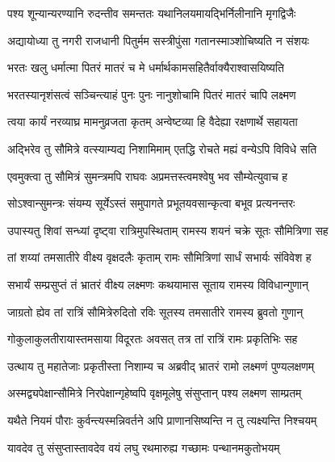 \twolineshloka
{पश्य शून्यान्यरण्यानि रुदन्तीव समन्ततः}
{यथानिलयमायद्भिर्निलीनानि मृगद्विजैः} %

\twolineshloka
{अद्यायोध्या तु नगरी राजधानी पितुर्मम}
{सस्त्रीपुंसा गतानस्माञ्शोचिष्यति न संशयः} %

\twolineshloka
{भरतः खलु धर्मात्मा पितरं मातरं च मे}
{धर्मार्थकामसहितैर्वाक्यैराश्वासयिष्यति} %

\twolineshloka
{भरतस्यानृशंसत्वं सञ्चिन्त्याहं पुनः पुनः}
{नानुशोचामि पितरं मातरं चापि लक्ष्मण} %

\twolineshloka
{त्वया कार्यं नरव्याघ्र मामनुव्रजता कृतम्}
{अन्वेष्टव्या हि वैदेह्या रक्षणार्थे सहायता} %

\twolineshloka
{अद्भिरेव तु सौमित्रे वत्स्याम्यद्य निशामिमाम्}
{एतद्धि रोचते मह्यं वन्येऽपि विविधे सति} %

\twolineshloka
{एवमुक्त्वा तु सौमित्रं सुमन्त्रमपि राघवः}
{अप्रमत्तस्त्वमश्वेषु भव सौम्येत्युवाच ह} %

\twolineshloka
{सोऽश्वान्सुमन्त्रः संयम्य सूर्येऽस्तं समुपागते}
{प्रभूतयवसान्कृत्वा बभूव प्रत्यनन्तरः} %

\twolineshloka
{उपास्यतु शिवां सन्ध्यां दृष्ट्वा रात्रिमुपस्थिताम्}
{रामस्य शयनं चक्रे सूतः सौमित्रिणा सह} %

\twolineshloka
{तां शय्यां तमसातीरे वीक्ष्य वृक्षदलैः कृताम्}
{रामः सौमित्रिणां सार्धं सभार्यः संविवेश ह} %

\twolineshloka
{सभार्यं सम्प्रसुप्तं तं भ्रातरं वीक्ष्य लक्ष्मणः}
{कथयामास सूताय रामस्य विविधान्गुणान्} %

\twolineshloka
{जाग्रतो ह्येव तां रात्रिं सौमित्रेरुदितो रविः}
{सूतस्य तमसातीरे रामस्य ब्रुवतो गुणान्} %

\twolineshloka
{गोकुलाकुलतीरायास्तमसाया विदूरतः}
{अवसत् तत्र तां रात्रिं रामः प्रकृतिभिः सह} %

\twolineshloka
{उत्थाय तु महातेजाः प्रकृतीस्ता निशाम्य च}
{अब्रवीद् भ्रातरं रामो लक्ष्मणं पुण्यलक्षणम्} %

\twolineshloka
{अस्मद्व्यपेक्षान्सौमित्रे निरपेक्षान्गृहेष्वपि}
{वृक्षमूलेषु संसुप्तान् पश्य लक्ष्मण साम्प्रतम्} %

\twolineshloka
{यथैते नियमं पौराः कुर्वन्त्यस्मन्निवर्तने}
{अपि प्राणानसिष्यन्ति न तु त्यक्ष्यन्ति निश्चयम्} %

\twolineshloka
{यावदेव तु संसुप्तास्तावदेव वयं लघु}
{रथमारुह्य गच्छामः पन्थानमकुतोभयम्} %

